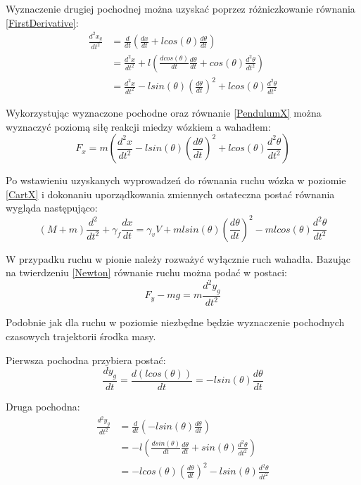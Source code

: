 \documentclass[12pt, twoside, openany]{report}
\theoremstyle{definition}
\begin{document}
Wyznaczenie drugiej pochodnej można uzyskać poprzez różniczkowanie równania \ref{FirstDerivative}:
\begin{equation} \label{Second}
\begin{aligned}
\frac{d^2x_g}{dt^2} &= \frac{d}{dt}(\frac{dx}{dt} + lcos(\theta)\frac{d\theta}{dt})\\
&= \frac{d^2x}{dt^2} + l(\frac{dcos(\theta)}{dt} \frac{d\theta}{dt} + cos(\theta) \frac{d^2\theta}{dt^2})\\
&= \frac{d^2x}{dt^2} - lsin(\theta)(\frac{d\theta}{dt})^2 + lcos(\theta) \frac{d^2\theta}{dt^2}
\end{aligned}
\end{equation}

Wykorzystując wyznaczone pochodne oraz równanie \ref{PendulumX} można wyznaczyć poziomą siłę reakcji miedzy wózkiem a wahadłem:
\begin{equation} \label{ReactionX}
F_x = m (\frac{d^2x}{dt^2} - lsin(\theta)(\frac{d\theta}{dt})^2 + lcos(\theta) \frac{d^2\theta}{dt^2})
\end{equation}

Po wstawieniu uzyskanych wyprowadzeń do równania ruchu wózka w poziomie \ref{CartX} i dokonaniu uporządkowania zmiennych ostateczna postać równania wygląda następująco:
\begin{equation} \label{CartFullX}
(M + m) \frac{d^2}{dt^2} + \gamma_f \frac{dx}{dt} = \gamma_v V + mlsin(\theta)(\frac{d\theta}{dt})^2 - mlcos(\theta) \frac{d^2\theta}{dt^2}
\end{equation}

W przypadku ruchu w pionie należy rozważyć wyłącznie ruch wahadła. Bazując na twierdzeniu \ref{Newton} równanie ruchu można podać w postaci:
\begin{equation} \label{PendulumY}
F_y - mg = m \frac{d^2y_g}{dt^2}
\end{equation}

Podobnie jak dla ruchu w poziomie niezbędne będzie wyznaczenie pochodnych czasowych trajektorii środka masy.

Pierwsza pochodna przybiera postać:
\begin{equation}
\frac{dy_g}{dt} = \frac{d(lcos(\theta))}{dt} = -lsin(\theta) \frac{d\theta}{dt}
\end{equation}

Druga pochodna:
\begin{equation}
\begin{aligned}
\frac{d^2y_g}{dt^2} &= \frac{d}{dt}(-lsin(\theta) \frac{d\theta}{dt})\\
&= -l(\frac{dsin(\theta)}{dt}\frac{d\theta}{dt} + sin(\theta) \frac{d^2\theta}{dt^2})\\
&= -lcos(\theta)(\frac{d\theta}{dt})^2 - lsin(\theta) \frac{d^2\theta}{dt^2}
\end{aligned}
\end{equation}
\end{document}

